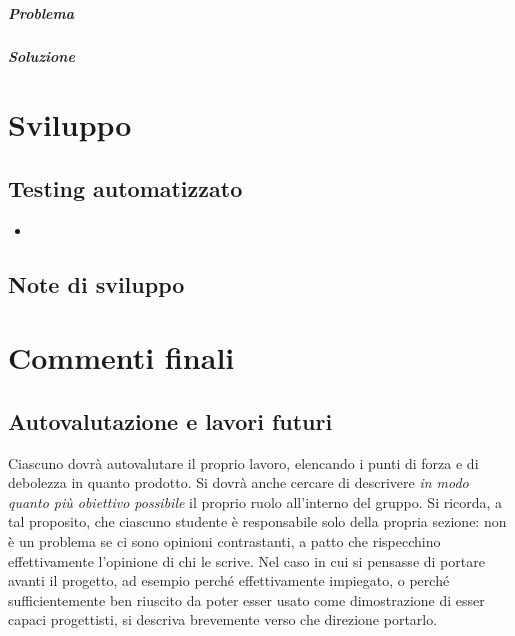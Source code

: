 \documentclass[a4paper,12pt]{report}
\begin{document}
\paragraph{Problema} %
\paragraph{Soluzione} %
%

\chapter{Sviluppo}
\section{Testing automatizzato}

\begin{itemize}
	\item 

\end{itemize}


\section{Note di sviluppo}


\chapter{Commenti finali}


\section{Autovalutazione e lavori futuri}

%
Ciascuno dovrà autovalutare il proprio lavoro, elencando i punti di forza e di debolezza in quanto prodotto.
Si dovrà anche cercare di descrivere \emph{in modo quanto più obiettivo possibile} il proprio ruolo all'interno del gruppo.
Si ricorda, a tal proposito, che ciascuno studente è responsabile solo della propria sezione: non è un problema se ci sono opinioni contrastanti, a patto che rispecchino effettivamente l'opinione di chi le scrive.
Nel caso in cui si pensasse di portare avanti il progetto, ad esempio perché effettivamente impiegato, o perché sufficientemente ben riuscito da poter esser usato come dimostrazione di esser capaci progettisti, si descriva brevemente verso che direzione portarlo.
\end{document}

